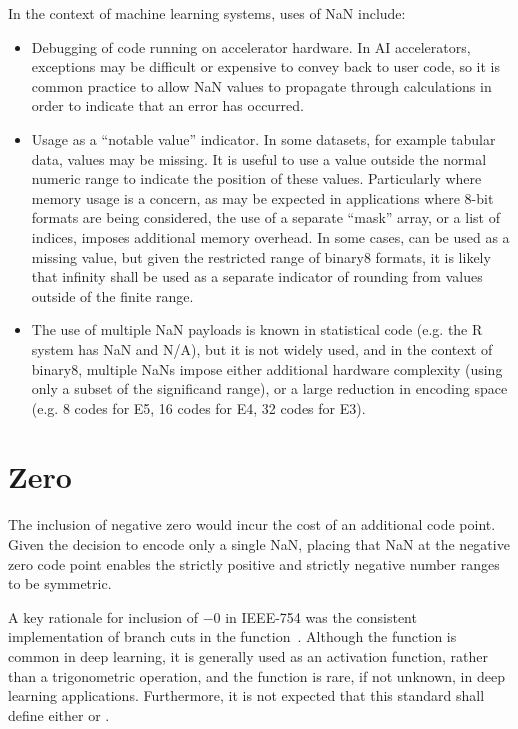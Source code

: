 \documentclass{article}
\begin{document}
In the context of machine learning systems, uses of NaN include:
\begin{itemize}
\item
Debugging of code running on accelerator hardware.
In AI accelerators, exceptions may be difficult or expensive to convey back to user code, so it is common practice to allow NaN values to propagate through calculations in order to indicate that an error has occurred.
\item
Usage as a “notable value” indicator.
In some datasets, for example tabular data, values may be missing.
It is useful to use a value outside the normal numeric range to indicate the position of these values.
Particularly where memory usage is a concern, as may be expected in applications where 8-bit formats are being considered, the use of a separate “mask” array, or a list of indices, imposes additional memory overhead.
In some cases,  can be used as a missing value, but given the restricted range of binary8 formats, it is likely that infinity shall be used as a separate indicator of rounding from values outside of the finite range.
\item 
The use of multiple NaN payloads is known in statistical code (e.g. the R system has NaN and N/A), but it is not widely used, and in the context of binary8, multiple NaNs impose either additional hardware complexity (using only a subset of the significand range), or a large reduction in encoding space (e.g. 8 codes for E5, 16 codes for E4, 32 codes for E3).
\end{itemize}

\section{Zero}

The inclusion of negative zero would incur the cost of an additional code point. Given the decision to encode only a single NaN, placing that NaN at the negative zero code point enables the strictly positive and strictly negative number ranges to be symmetric.

A key rationale for inclusion of $-0$ in IEEE-754 was the consistent implementation of branch cuts in the  function~\cite{kahan}.  Although the  function is common in deep learning, it is generally used as an activation function, rather than a trigonometric operation, and the  function is rare, if not unknown, in deep learning applications.
Furthermore, it is not expected that this standard shall define either  or .
\end{document}
